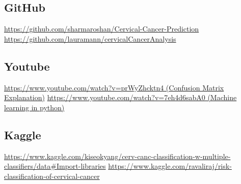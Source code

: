 \documentclass{article}
\begin{document}
\subsection*{GitHub}
\url{https://github.com/sharmaroshan/Cervical-Cancer-Prediction}
\url{https://github.com/lauramann/cervicalCancerAnalysis}
\subsection*{Youtube}
\url{https://www.youtube.com/watch?v=prWyZhcktn4    (Confusion Matrix Explanation)}
\url{https://www.youtube.com/watch?v=7eh4d6sabA0        (Machine learning in python)}
\subsection*{Kaggle}
\url{https://www.kaggle.com/kiseokyang/cerv-canc-classification-w-multiple-classifiers/data#Import-libraries}
\url{https://www.kaggle.com/ravaliraj/risk-classification-of-cervical-cancer}
\end{document}
